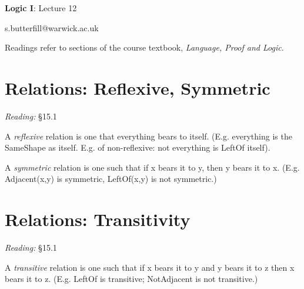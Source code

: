 \documentclass[12pt]{extarticle}
\date{}
\makeatletter
\def \ititle {Origins of Mind}
\def \isubtitle {Lecture 08}
\def \iemail{s.butterfill@warwick.ac.uk}
\makeatother
\begin{document}

\begin{multicols*}{3}

\setlength\footnotesep{1em}








\def \ititle {Logic I}
 
\def \isubtitle {Lecture 12}
 
\begin{center}
 
{\Large
 
\textbf{\ititle}: \isubtitle
 
}
 
 
 
\iemail %
 
\end{center}
 
Readings refer to sections of the course textbook, \emph{Language, Proof and Logic}.
 
 
 
\section{Relations: Reflexive, Symmetric}
 
\emph{Reading:} §15.1
 
A \emph{reflexive} relation is one that everything bears to itself. (E.g. everything is the SameShape as itself. E.g. of non-reflexive: not everything is LeftOf itself).
 
A \emph{symmetric} relation is one such that if x bears it to y, then y bears it to x. (E.g. Adjacent(x,y) is symmetric, LeftOf(x,y) is not symmetric.)
 
 
 
\section{Relations: Transitivity}
 
\emph{Reading:} §15.1
 
A \emph{transitive} relation is one such that if x bears it to y and y bears it to z then x bears it to z. (E.g. LeftOf is transitive; NotAdjacent is not transitive.)
 

\end{multicols*}
\end{document}

